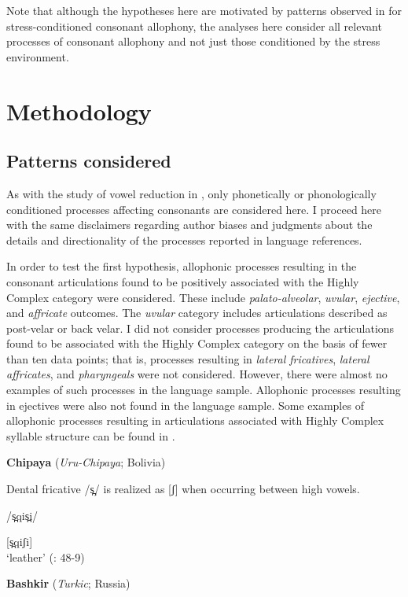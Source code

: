   Note that although the hypotheses here are motivated by patterns observed in  for stress-conditioned consonant allophony, the analyses here consider all relevant processes of consonant allophony and not just those conditioned by the stress environment.

\section{Methodology}\label{sec:7.2}
\subsection{Patterns considered}\label{sec:7.2.1}

  As with the study of vowel reduction in , only phonetically or phonologically conditioned processes affecting consonants are considered here. I proceed here with the same disclaimers regarding author biases and judgments about the details and directionality of the processes reported in language references.

  In order to test the first hypothesis, allophonic processes resulting in the consonant articulations found to be positively associated with the Highly Complex category were considered. These include \textit{palato-alveolar}, \textit{uvular}, \textit{ejective}, and \textit{affricate} outcomes. The \textit{uvular} category includes articulations described as post-velar or back velar. I did not consider processes producing the articulations found to be associated with the Highly Complex category on the basis of fewer than ten data points; that is, processes resulting in \textit{lateral fricatives}, \textit{lateral affricates}, and \textit{pharyngeals} were not considered. However, there were almost no examples of such processes in the language sample. Allophonic processes resulting in ejectives were also not found in the language sample. Some examples of allophonic processes resulting in articulations associated with Highly Complex syllable structure can be found in .

\ea\label{ex:7.3}
  \textbf{Chipaya} (\textit{Uru-Chipaya}; Bolivia)

Dental fricative /s̪/ is realized as [ʃ] when occurring between high vowels.

/s̪qis̪i/

[s̪qiʃi]\\
\glt ‘leather’
(\citealt{Cerrón-Palomino2006}: 48-9)
\z

\ea\label{ex:7.4}
  \textbf{Bashkir} (\textit{Turkic}; Russia)

